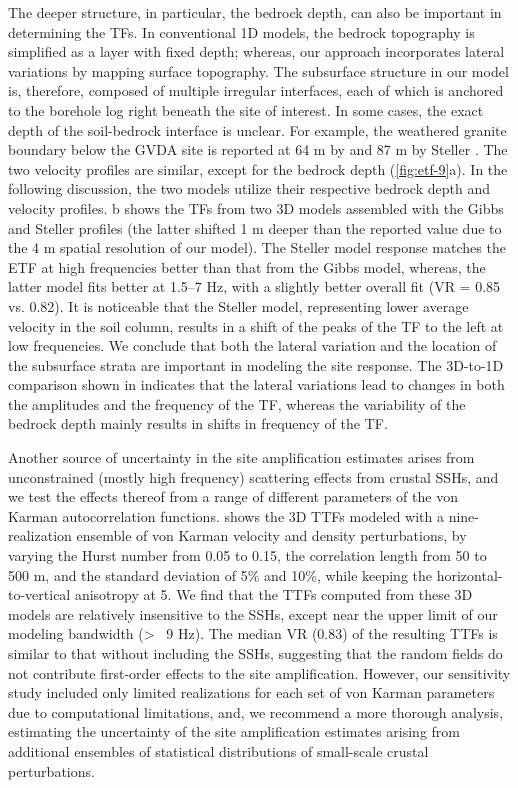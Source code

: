 {The deeper structure, in particular, the bedrock depth, can also be important in determining the TFs. In conventional 1D models, the bedrock topography is simplified as a layer with fixed depth; whereas, our approach incorporates lateral variations by mapping surface topography. The subsurface structure in our model is, therefore, composed of multiple irregular interfaces, each of which is anchored to the borehole log right beneath the site of interest. In some cases, the exact depth of the soil-bedrock interface is unclear. For example, the weathered granite boundary below the GVDA site is reported at 64 m by \citet{gibbsNearsurfaceSwaveVelocities1989} and 87 m by Steller \citet{stellerNewBoreholeGeophysical1996}. The two velocity profiles are similar, except for the bedrock depth (\cref{fig:etf-9}a). In the following discussion, the two models utilize their respective bedrock depth and velocity profiles. b shows the TFs from two 3D models assembled with the Gibbs and Steller profiles (the latter shifted 1 m deeper than the reported value due to the 4 m spatial resolution of our model). The Steller model response matches the ETF at high frequencies better than that from the Gibbs model, whereas, the latter model fits better at 1.5–7 Hz, with a slightly better overall fit (VR = 0.85 vs. 0.82). It is noticeable that the Steller model, representing lower average velocity in the soil column, results in a shift of the peaks of the TF to the left at low frequencies. We conclude that both the lateral variation and the location of the subsurface strata are important in modeling the site response. The 3D-to-1D comparison shown in  indicates that the lateral variations lead to changes in both the amplitudes and the frequency of the TF, whereas the variability of the bedrock depth mainly results in shifts in frequency of the TF.

Another source of uncertainty in the site amplification estimates arises from unconstrained (mostly high frequency) scattering effects from crustal SSHs, and we test the effects thereof from a range of different parameters of the von Karman autocorrelation functions.  shows the 3D TTFs modeled with a nine-realization ensemble of von Karman velocity and density perturbations, by varying the Hurst number from 0.05 to 0.15, the correlation length from 50 to 500 m, and the standard deviation of 5\% and 10\%, while keeping the horizontal-to-vertical anisotropy at 5. We find that the TTFs computed from these 3D models are relatively insensitive to the SSHs, except near the upper limit of our modeling bandwidth (> ~9 Hz). The median VR (0.83) of the resulting TTFs is similar to that without including the SSHs, suggesting that the random fields do not contribute first-order effects to the site amplification. However, our sensitivity study included only limited realizations for each set of von Karman parameters due to computational limitations, and, we recommend a more thorough analysis, estimating the uncertainty of the site amplification estimates arising from additional ensembles of statistical distributions of small-scale crustal perturbations.

}
